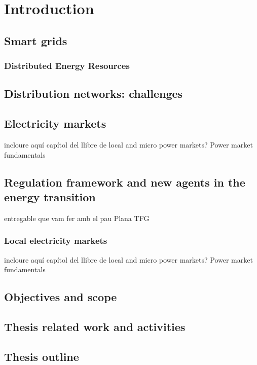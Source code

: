 \chapter{Introduction}
\label{chapterIntro}

\section{Smart grids}

\subsection{Distributed Energy Resources} \label{subsec:DG}

\section{Distribution networks: challenges}

\section{Electricity markets}
incloure aquí capítol del llibre de local and micro power markets? 
Power market fundamentals 


\section{Regulation framework and new agents in the energy transition}
entregable que vam fer amb el pau Plana TFG

\subsection{Local electricity markets}
incloure aquí capítol del llibre de local and micro power markets? 
Power market fundamentals 

\newpage 
\section{Objectives and scope}
	
\newpage 
\section{Thesis related work and activities}
	

\newpage 
\section{Thesis outline}
	


